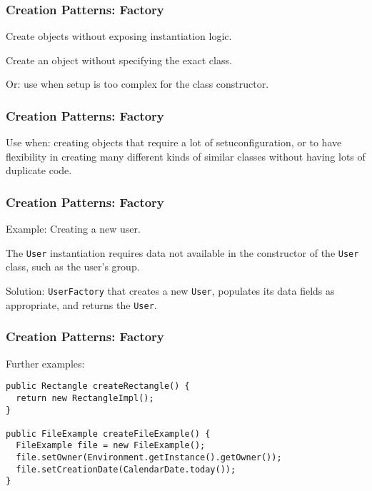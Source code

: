 \begin{frame}
\frametitle{Creation Patterns: Factory}

\begin{changemargin}{1cm}
Create objects without exposing instantiation logic.

Create an object without specifying the exact class.

Or: use when setup is too complex for the class constructor.

\end{changemargin}
\end{frame}

\begin{frame}
\frametitle{Creation Patterns: Factory}

\begin{changemargin}{1cm}

Use when: creating objects that require a lot of setuconfiguration, or to have flexibility in creating many different kinds of similar classes without having lots of duplicate code.

\end{changemargin}
\end{frame}

\begin{frame}
\frametitle{Creation Patterns: Factory}

\begin{changemargin}{1cm}
Example: Creating a new user. 

The \texttt{User} instantiation requires data not available in the constructor of the \texttt{User} class, such as the user's group.

Solution: \texttt{UserFactory} that creates a new \texttt{User}, populates its data fields as appropriate, and returns the \texttt{User}.

\end{changemargin}
\end{frame}

\begin{frame}[fragile]
\frametitle{Creation Patterns: Factory}
\begin{changemargin}{1cm}
Further examples:

{\scriptsize
\begin{verbatim}
public Rectangle createRectangle() {
  return new RectangleImpl();
}

public FileExample createFileExample() {
  FileExample file = new FileExample();
  file.setOwner(Environment.getInstance().getOwner());
  file.setCreationDate(CalendarDate.today());
}

\end{verbatim}
}
\end{changemargin}
\end{frame}


